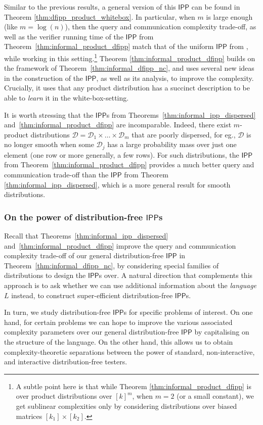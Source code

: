 \documentclass[10pt,a4paper]{article}
\newcommand{\IPP}{\mathsf{IPP}}
\newcommand{\sD}{\mathcal{D}}
\begin{document}
Similar to the previous results, a general version of this $\IPP$ can be found in Theorem \ref{thm:dfipp_product_whitebox}. In particular, when $m$ is large enough (like $m = \log(n)$), then the query and communication complexity trade-off, as well as the verifier running time of the $\IPP$ from Theorem~\ref{thm:informal_product_dfipp} match that of the uniform $\IPP$ from \cite{RVW}, while working in this setting.\footnote{A subtle point here is that while Theorem \ref{thm:informal_product_dfipp} is over product distributions over $[k]^m$, when $m = 2$ (or a small constant), we get sublinear complexities only by considering distributions over biased matrices $[k_1] \times [k_2]$.} 
Theorem \ref{thm:informal_product_dfipp} builds on the framework of Theorem~\ref{thm:informal_dfipp_nc}, and uses several new ideas in the construction of the $\IPP$, as well as its analysis, to improve the complexity. Crucially, it uses that any product distribution has a succinct description to be able to \textit{learn} it in the white-box-setting. 

It is worth stressing that the $\IPP$s from Theorems~\ref{thm:informal_ipp_dispersed} and~\ref{thm:informal_product_dfipp} are incomparable. Indeed, there exist $m$-product distributions $\sD = \sD_1 \times \dots \times \sD_m$ that are poorly dispersed, for eg., $\sD$ is no longer smooth when some $\sD_j$ has a large probability mass over just one element (one row or more generally, a few rows). For such distributions, the $\IPP$ from Theorem~\ref{thm:informal_product_dfipp} provides a much better query and communication trade-off than the $\IPP$ from Theorem \ref{thm:informal_ipp_dispersed}, which is a more general result for smooth distributions.

\subsubsection{On the power of distribution-free $\IPP$s}
Recall that Theorems~\ref{thm:informal_ipp_dispersed} and~\ref{thm:informal_product_dfipp} improve the query and communication complexity trade-off of our general distribution-free $\IPP$ in Theorem~\ref{thm:informal_dfipp_nc}, by considering special families of distributions to design the $\IPP$s over. A natural direction that complements this approach is to ask whether we can use additional information about the \textit{language} $L$ instead, to construct super-efficient distribution-free $\IPP$s. 

In turn, we study distribution-free $\IPP$s for specific problems of interest. On one hand, for certain problems we can hope to improve the various associated complexity parameters over our general distribution-free $\IPP$ by capitalising on the structure of the language. On the other hand, this allows us to obtain complexity-theoretic separations between the power of standard, non-interactive, and interactive distribution-free testers.
\end{document}
